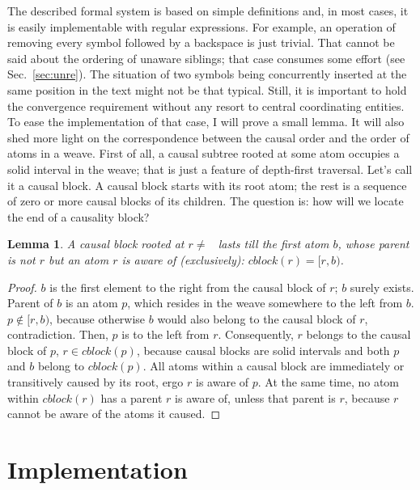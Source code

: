 \documentclass{acm_proc_article-sp}
\newtheorem{lemma}{Lemma}
\begin{document}
The described formal system is based on simple definitions and, in most cases, it is easily implementable with regular expressions.
For example, an operation of removing every symbol followed by a backspace is just trivial.
That cannot be said about the ordering of unaware siblings; that case consumes some effort (see Sec.~\ref{sec:unre}).
The situation of two symbols being concurrently inserted at the same position in the text might not be that typical.
Still, it is important to hold the convergence requirement without any resort to central coordinating entities. 
To ease the implementation of that case, I will prove
a small lemma. It will also shed more light on the
correspondence between the causal order and the order of atoms
in a weave.
First of all, a causal subtree rooted at some atom occupies
a solid interval in the weave; that is just a feature of
depth-first traversal. Let's call it a causal block.
A causal block starts with its root atom; the rest is
a sequence of zero or more causal blocks of its children.
The question is: how will we locate the end of a causality
block?
\begin{lemma} A causal block rooted at $r \ne$ \aum ~lasts till
the first atom $b$, whose parent is not $r$ but an atom
$r$ is aware of (exclusively):  $cblock(r) = [r,b)$. \label{lemma:1}
\end{lemma} 
\begin{proof}
$b$ is the first element to the right from the causal
block of $r$; $b$ surely exists. Parent of $b$ is an atom $p$,
which resides in the weave somewhere to the left from $b$.
$p \notin [r,b)$, because otherwise $b$ would also belong
to the causal block of $r$, contradiction.
Then, $p$ is to the left from $r$. Consequently, $r$ belongs
to the causal block of $p$, $r \in cblock(p)$, because
causal blocks are solid intervals and both $p$ and $b$
belong to $cblock(p)$. All atoms within a causal block are
immediately or transitively caused by its root,
ergo $r$ is aware of $p$. At the same time, no atom
within $cblock(r)$ has a parent $r$ is aware of, unless
that parent is $r$, because $r$ cannot be aware of the
atoms it caused.
\end{proof}


\section{Implementation}	   \label{sec:algos}
\end{document}
